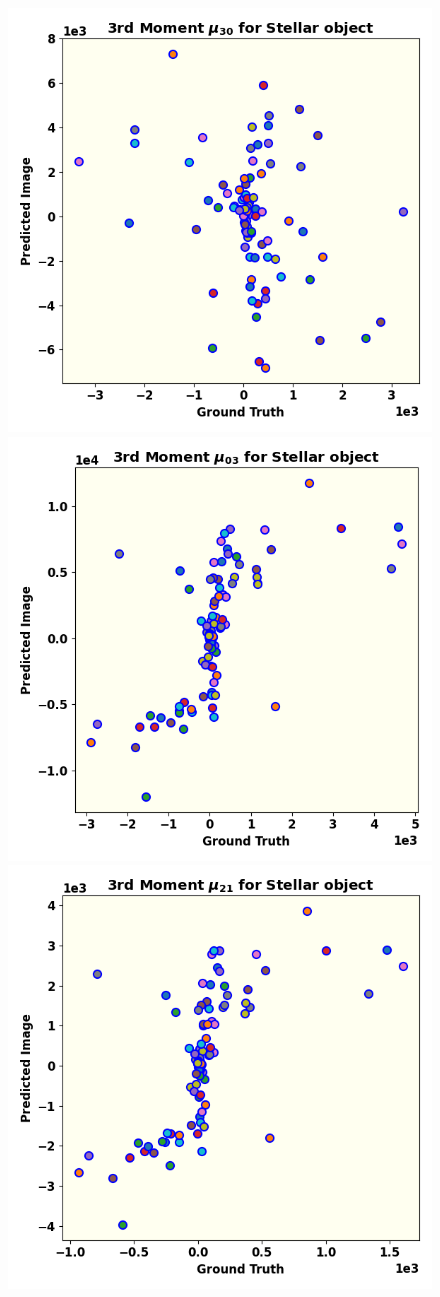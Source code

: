 \begin{figure}
  \includegraphics[width=.49\linewidth]{fig/moments/mom6.png}\hfil
  \includegraphics[width=.49\linewidth]{fig/moments/mom7.png}
  \includegraphics[width=.49\linewidth]{fig/moments/mom8.png}

\end{figure}
